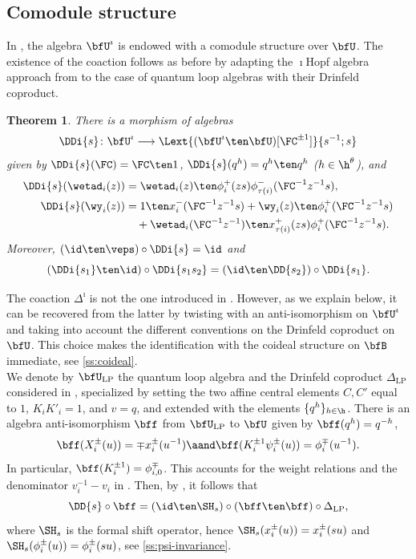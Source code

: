 \documentclass[reqno]{amsart}
\numberwithin{equation}{section}
\newtheorem*{theorem}{Theorem}
\begin{document}
\subsection{Comodule structure \cite{lu-pan-26}}\label{ss:comodule-structure}
In \cite[Prop.~4.15]{lu-pan-26}, the algebra $\bfU^\imath$ is endowed with a 
comodule structure over $\bfU$. The existence of the coaction follows as before 
by adapting the $\imath$Hopf algebra approach from \cite{chen-pan-ruan-wang-25}
to the case of quantum loop algebras with their Drinfeld coproduct.
\begin{theorem}\cite{lu-pan-26}\label{thm:Lu-Pan-coaction}
There is a morphism of algebras
\[
\DDi{s}\colon\bfU^\imath\longrightarrow
\Lext{(\bfU^\imath\ten\bfU)[\FC^{\pm1}]}{s^{-1};s}
\]
given by $\DDi{s}(\FC)=\FC\ten1$,
$\DDi{s}(q^h)=q^h\ten q^h$ ($h\in\h^{\theta}$), and
\begin{align}
	\label{eq:DDi-weta-field}
	\DDi{s}(\wetad_i(z))
	&=\wetad_i(z)\ten\phi_i^+(zs)
	\phi_{\tau(i)}^-(\FC^{-1}z^{-1}s),\\
	\label{eq:DDi-wy-field}
	\DDi{s}(\wy_i(z))
	&=1\ten x_i^-(\FC^{-1}z^{-1}s)
	+\wy_i(z)\ten\phi_i^+(\FC^{-1}z^{-1}s)\notag\\
	&\quad+\wetad_i(\FC^{-1}z^{-1})\ten
	x_{\tau(i)}^+(zs)\phi_i^+(\FC^{-1}z^{-1}s).
\end{align}
Moreover, $(\id\ten\veps)\circ\DDi{s}=\id$ and
\[
(\DDi{s_1}\ten\id)\circ\DDi{s_1s_2}
=(\id\ten\DD{s_2})\circ\DDi{s_1}.
\]
\end{theorem}
The coaction $\Delta^\imath$ is not the one introduced in \cite{lu-pan-26}. However, as we explain below, it can be recovered from the latter by twisting with an anti-isomorphism on $\bfU^\imath$ and taking into account the different conventions on the Drinfeld coproduct on $\bfU$. This choice makes the identification with the coideal structure on $\bfB$ immediate, see \ref{ss:coideal}.\\

We denote by $\bfU_{\operatorname{LP}}$ the quantum loop algebra
and the Drinfeld coproduct $\Delta_{\operatorname{LP}}$ considered in \cite{lu-pan-26}, specialized by setting the two affine central elements $C,C'$ equal to $1$, $K_iK'_i=1$, and $v=q$, and extended with the elements $\{q^h\}_{h\in\h}$.
There is an algebra anti-isomorphism $\bff$ from $\bfU_{\operatorname{LP}}$ to $\bfU$ given by $\bff(q^h)=q^{-h}$,
\begin{equation}\label{eq:LP-coproduct-dictionary}
\bff(X_i^\pm(u))=\mp x_i^\pm(u^{-1})
\aand
\bff(K_i^{\pm1}\psi_i^\pm(u))=\phi_i^\mp(u^{-1}).
\end{equation}
In particular, $\bff(K_i^{\pm1})=\phi^\mp_{i,0}$. 
This accounts for the weight relations and
the denominator $v_i^{-1}-v_i$ in \cite[Eq.~(2.14)]{lu-pan-26}.
Then, by \cite[Eqs.~(4.4)--(4.7)]{lu-pan-26}, it follows that
\begin{equation}\label{eq:LP-coproduct-intertwiner}
\DD{s}\circ\bff
=(\id\ten\SH_s)\circ(\bff\ten\bff)\circ\Delta_{\mathrm{LP}},
\end{equation}
where $\SH_s$ is the formal shift operator, hence $\SH_s(x_i^\pm(u))=x_i^\pm(su)$ and
$\SH_s(\phi_i^\pm(u))=\phi_i^\pm(su)$, see \ref{ss:psi-invariance}.\\
\end{document}
